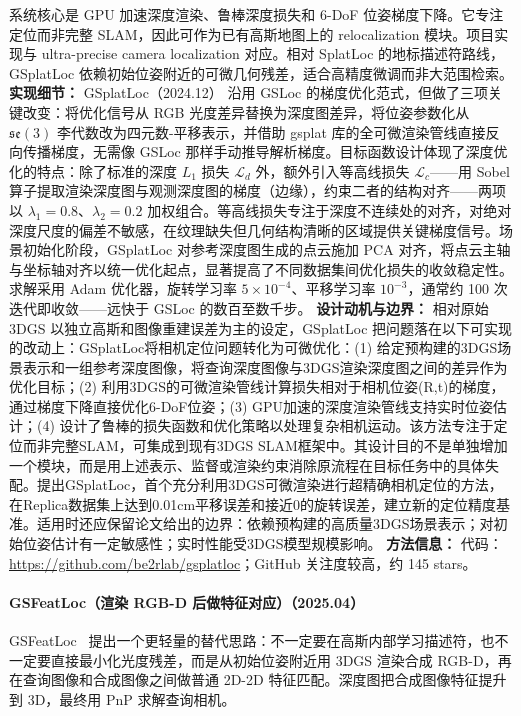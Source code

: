 系统核心是 GPU 加速深度渲染、鲁棒深度损失和 6-DoF 位姿梯度下降。它专注定位而非完整 SLAM，因此可作为已有高斯地图上的 relocalization 模块。项目实现与 ultra-precise camera localization 对应。相对 SplatLoc 的地标描述符路线，GSplatLoc 依赖初始位姿附近的可微几何残差，适合高精度微调而非大范围检索。
\textbf{实现细节：} GSplatLoc（2024.12） 沿用 GSLoc 的梯度优化范式，但做了三项关键改变：将优化信号从 RGB 光度差异替换为深度图差异，将位姿参数化从 $\mathfrak{se}(3)$ 李代数改为四元数-平移表示，并借助 gsplat 库的全可微渲染管线直接反向传播梯度，无需像 GSLoc 那样手动推导解析梯度。目标函数设计体现了深度优化的特点：除了标准的深度 $L_1$ 损失 $\mathcal{L}_d$ 外，额外引入等高线损失 $\mathcal{L}_c$——用 Sobel 算子提取渲染深度图与观测深度图的梯度（边缘），约束二者的结构对齐——两项以 $\lambda_1\!=\!0.8$、$\lambda_2\!=\!0.2$ 加权组合。等高线损失专注于深度不连续处的对齐，对绝对深度尺度的偏差不敏感，在纹理缺失但几何结构清晰的区域提供关键梯度信号。场景初始化阶段，GSplatLoc 对参考深度图生成的点云施加 PCA 对齐，将点云主轴与坐标轴对齐以统一优化起点，显著提高了不同数据集间优化损失的收敛稳定性。求解采用 Adam 优化器，旋转学习率 $5\!\times\!10^{-4}$、平移学习率 $10^{-3}$，通常约 100 次迭代即收敛——远快于 GSLoc 的数百至数千步。
\textbf{设计动机与边界：} 相对原始 3DGS 以独立高斯和图像重建误差为主的设定，GSplatLoc 把问题落在以下可实现的改动上：GSplatLoc将相机定位问题转化为可微优化：(1) 给定预构建的3DGS场景表示和一组参考深度图像，将查询深度图像与3DGS渲染深度图之间的差异作为优化目标；(2) 利用3DGS的可微渲染管线计算损失相对于相机位姿(R,t)的梯度，通过梯度下降直接优化6-DoF位姿；(3) GPU加速的深度渲染管线支持实时位姿估计；(4) 设计了鲁棒的损失函数和优化策略以处理复杂相机运动。该方法专注于定位而非完整SLAM，可集成到现有3DGS SLAM框架中。其设计目的不是单独增加一个模块，而是用上述表示、监督或渲染约束消除原流程在目标任务中的具体失配。提出GSplatLoc，首个充分利用3DGS可微渲染进行超精确相机定位的方法，在Replica数据集上达到0.01cm平移误差和接近0的旋转误差，建立新的定位精度基准。适用时还应保留论文给出的边界：依赖预构建的高质量3DGS场景表示；对初始位姿估计有一定敏感性；实时性能受3DGS模型规模影响。
\textbf{方法信息：} 代码：\url{https://github.com/be2rlab/gsplatloc}；GitHub 关注度较高，约 145 stars。



\paragraph{GSFeatLoc（渲染 RGB-D 后做特征对应）（2025.04）}
GSFeatLoc~\cite{2504_20379} 提出一个更轻量的替代思路：不一定要在高斯内部学习描述符，也不一定要直接最小化光度残差，而是从初始位姿附近用 3DGS 渲染合成 RGB-D，再在查询图像和合成图像之间做普通 2D-2D 特征匹配。深度图把合成图像特征提升到 3D，最终用 PnP 求解查询相机。

